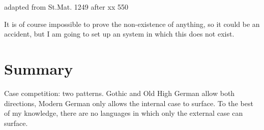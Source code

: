  adapted from St.Mat. 1249 after xx  550

It is of course impossible to prove the non-existence of anything, so it could be an accident, but I am going to set up an system in which this does not exist.


\section{Summary}

Case competition: two patterns. Gothic and Old High German allow both directions, Modern German only allows the internal case to surface. To the best of my knowledge, there are no languages in which only the external case can surface.
